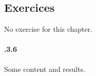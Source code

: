 \subsection{Exercices}
\label{sec:exercices}

\exercisesection
No exercise for this chapter.

\exercisesection
\paragraph{\theexercisecounter.3.6}
Some content and results.

